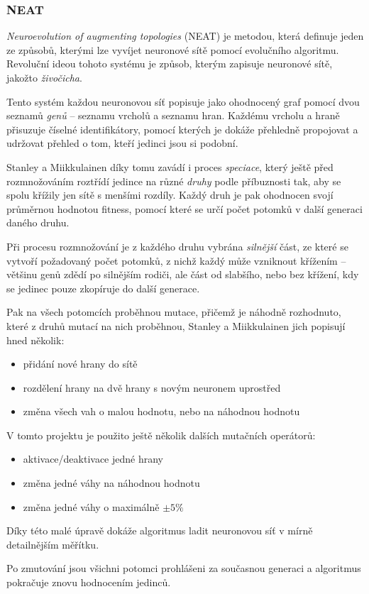 \documentclass[a4]{article}
\begin{document}
\subsubsection{NEAT}
\emph{Neuroevolution of augmenting topologies}\cite{neat} (NEAT) je metodou, která definuje jeden ze způsobů, kterými lze vyvíjet neuronové sítě pomocí evolučního algoritmu. Revoluční ideou tohoto systému je způsob, kterým zapisuje neuronové sítě, jakožto \emph{živočicha}.\par
Tento systém každou neuronovou síť popisuje jako ohodnocený graf pomocí dvou seznamů \emph{genů} -- seznamu vrcholů a seznamu hran. Každému vrcholu a hraně přisuzuje číselné identifikátory, pomocí kterých je dokáže přehledně propojovat a udržovat přehled o tom, kteří jedinci jsou si  podobní.\par
Stanley a Miikkulainen díky tomu zavádí i proces \emph{speciace}, který ještě před rozmnožováním roztřídí jedince na různé \emph{druhy} podle příbuznosti tak, aby se spolu křížily jen sítě s menšími rozdíly. Každý druh je pak ohodnocen svojí průměrnou hodnotou fitness, pomocí které se určí počet potomků v další generaci daného druhu.\par
Při procesu rozmnožování je z každého druhu vybrána \emph{silnější} část, ze které se vytvoří požadovaný počet potomků, z nichž každý může vzniknout křížením -- většinu genů zdědí po silnějším rodiči, ale část od slabšího, nebo bez křížení, kdy se jedinec pouze zkopíruje do další generace.\par
Pak na všech potomcích proběhnou mutace, přičemž je náhodně rozhodnuto, které z druhů mutací na nich proběhnou, Stanley a Miikkulainen jich popisují hned několik:
\begin{itemize}
\item{přidání nové hrany do sítě}
\item{rozdělení hrany na dvě hrany s novým neuronem uprostřed}
\item{změna všech vah o malou hodnotu, nebo na náhodnou hodnotu}
\end{itemize}
V tomto projektu je použito ještě několik dalších mutačních operátorů:
\begin{itemize}
\item{aktivace/deaktivace jedné hrany}
\item{změna jedné váhy na náhodnou hodnotu}
\item{změna jedné váhy o maximálně $\pm 5\%$}
\end{itemize}
Díky této malé úpravě dokáže algoritmus ladit neuronovou síť v mírně detailnějším měřítku.\par
Po zmutování jsou všichni potomci prohlášeni za současnou generaci a algoritmus pokračuje znovu hodnocením jedinců.
\end{document}
